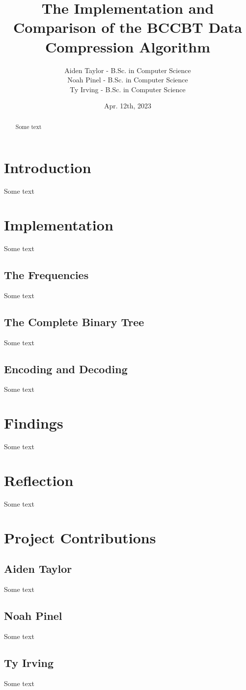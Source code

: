 \documentclass[12pt]{IEEEtran}
\newcommand{\Aiden}{Aiden Taylor - B.Sc. in Computer Science}
\newcommand{\Noah}{Noah Pinel - B.Sc. in Computer Science}
\newcommand{\Ty}{Ty Irving - B.Sc. in Computer Science}
\begin{document}
\title{The Implementation and Comparison of the BCCBT Data Compression Algorithm}
\author{
\begin{tabular}{l}
    \Aiden \\ \Noah\\ \Ty\\ 
\end{tabular}}
\date{Apr. 12th, 2023}

\maketitle

\begin{abstract}
Some text
\end{abstract}

\section{Introduction}
Some text \cite{Sjostrand}

\newpage %

\section{Implementation}
Some text
\subsection{The Frequencies}
Some text
\subsection{The Complete Binary Tree}
Some text
\subsection{Encoding and Decoding}
Some text

\newpage

\section{Findings}
Some text

\newpage

\section{Reflection}
Some text

\newpage

\section{Project Contributions}
\subsection{Aiden Taylor}
Some text
\subsection{Noah Pinel}
Some text
\subsection{Ty Irving}
Some text



\end{document}
